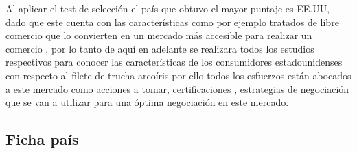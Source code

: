 \documentclass[
  stu,
  floatsintext,
  longtable,
  a4paper,
  nolmodern,
  notxfonts,
  notimes,
  12pt,
  colorlinks=true,linkcolor=blue,citecolor=blue,urlcolor=blue]{apa7}
\begin{document}
Al aplicar el test de selección el país que obtuvo el mayor puntaje es
EE.UU, dado que este cuenta con las características como por ejemplo
tratados de libre comercio que lo convierten en un mercado más accesible
para realizar un comercio , por lo tanto de aquí en adelante se
realizara todos los estudios respectivos para conocer las
características de los consumidores estadounidenses con respecto al
filete de trucha arcoíris por ello todos los esfuerzos están abocados a
este mercado como acciones a tomar, certificaciones , estrategias de
negociación que se van a utilizar para una óptima negociación en este
mercado.

\subsection{Ficha país}\label{ficha-pauxeds}
\end{document}
